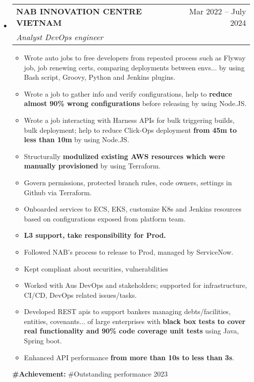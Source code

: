 \documentclass[letterpaper,12pt]{article}[leftmargin=*]
\makeatletter
\def \entryspacing {5pt}
\newcommand{\resumeEntryStart}{\begin{itemize}[leftmargin=2.5mm]}
\newcommand{\resumeEntryEnd}{\end{itemize}\vspace{\entryspacing}}
\newcommand{\resumeItemListStart}{\begin{itemize}[leftmargin=4.5mm]}
\newcommand{\resumeItemListEnd}{\end{itemize}}
\newcommand{\resumeItem}[1]{
  \item\small{
    {#1 \vspace{-2pt}}
  }
}
\newcommand{\resumeEntryTSDL}[4]{
  \vspace{-1pt}\item[]
    \begin{tabularx}{0.97\textwidth}{X@{\hspace{60pt}}r}
      \textbf{\color{primary}#1} & {\firabook\color{accent}\small#2} \\
      \textit{\color{accent}\small#3} & {\firabook\color{accent}\small#4} \\
    \end{tabularx}\vspace{-6pt}
}
\makeatother
\begin{document}
  \resumeEntryStart
    \resumeEntryTSDL
      {NAB INNOVATION CENTRE VIETNAM}{Mar 2022 -- July 2024}
      {Analyst DevOps engineer}{}
    \resumeItemListStart
      \resumeItem {Wrote auto jobs to free developers from repeated process such as Flyway job, job renewing certs, comparing deployments between envs... by using Bash script, Groovy, Python and Jenkins plugins.}
      \resumeItem {Wrote a job to gather info and verify configurations, help to \textbf{reduce almost 90\% wrong configurations} before releasing by using Node.JS.}
      \resumeItem {Wrote a job interacting with Harness APIs for bulk triggering builds, bulk deployment; help to reduce Click-Ops deployment \textbf{from 45m to less than 10m} by using Node.JS.}
      \resumeItem {Structurally \textbf{modulized existing AWS resources which were manually provisioned} by using Terraform.}
      \resumeItem {Govern permissions, protected branch rules, code owners, settings in Github via Terraform.}
      \resumeItem {Onboarded services to ECS, EKS, customize K8s and Jenkins resources based on  configurations exposed from platform team.}
      \resumeItem {\textbf{L3 support, take responsibility for Prod.}}
      \vspace{1pt}\small{
      }\vspace{-1pt}
      \resumeItem {Followed NAB's process to release to Prod, managed by ServiceNow.}
      \resumeItem {Kept compliant about securities, vulnerabilities}
      \vspace{1pt}\small{
      }\vspace{-1pt}
      \resumeItem {Worked with Aus DevOps and stakeholders; supported for infrastructure, CI/CD, DevOps related issues/tasks.}
      \vspace{-10pt}\resumeItem {Developed REST apis to support bankers managing debts/facilities, entities, covenants... of large enterprises with \textbf{black box tests to cover real functionality and 90\% code coverage unit tests} using Java, Spring boot.}
      \vspace{2pt}\small{
      }\vspace{-1pt}
      \resumeItem {Enhanced API performance \textbf{from more than 10s to less than 3s}.}
    \resumeItemListEnd
    \textbf{\color{primary}\small#Achievement: }{\small#Outstanding performance 2023}
  \resumeEntryEnd
\end{document}
